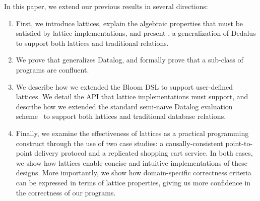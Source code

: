 In this paper, we extend our previous results in several directions:
\begin{enumerate}
\item
  First, we introduce lattices, explain the algebraic properties that must be
  satisfied by lattice implementations, and present \latlang, a generalization
  of Dedalus to support both lattices and traditional relations.

\item
  We prove that \latlang generalizes Datalog, and formally prove that a sub-class of
  \latlang programs are confluent.

\item
  We describe how we extended the Bloom DSL to support user-defined lattices. We
  detail the API that lattice implementations must support, and describe how we
  extended the standard semi-na\"{i}ve Datalog evaluation scheme~\cite{semi-naive}
  to support both lattices and traditional database relations.

\item
  Finally, we examine the effectiveness of lattices as a practical programming
  construct through the use of two case studies: a causally-consistent
  point-to-point delivery protocol and a replicated shopping cart service. In
  both cases, we show how lattices enable concise and intuitive implementations
  of these designs. More importantly, we show how domain-specific correctness
  criteria can be expressed in terms of lattice properties, giving us more
  confidence in the correctness of our programs.
\end{enumerate}
